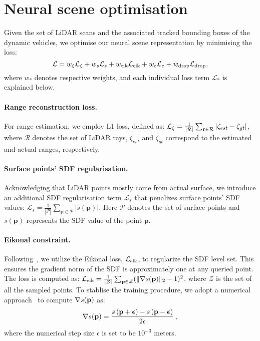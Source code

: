 \section{Neural scene optimisation} \label{sec:optmisation}
Given the set of LiDAR scans and the associated tracked bounding boxes of the dynamic vehicles, we optimise our neural scene representation by minimising the loss:
\begin{equation}
    \mathcal{L} = w_{\zeta} \mathcal{L}_{\zeta} +  w_{s} \mathcal{L}_{s} + w_{\text{eik}} \mathcal{L}_{\text{eik}} + w_{e} \mathcal{L}_{e} + w_{\text{drop}} \mathcal{L}_{\text{drop}},
    \label{loss}
\end{equation}
where $w_{*}$ denotes respective weights, and each individual loss term $\mathcal{L}_*$ is explained below.


\paragraph{Range reconstruction loss.}
For range estimation, we employ L1 loss, defined as: $\mathcal{L}_{\zeta} = \frac{1}{|\mathcal{R}|}\sum_{\mathbf{r} \in \mathcal{R}}|\zeta_{est} -\zeta_{gt}|$, where $\mathcal{R}$ denotes the set of LiDAR rays, $\zeta_{est}$ and $\zeta_{gt}$ correspond to the estimated and actual ranges, respectively. 


\paragraph{Surface points' SDF regularisation.} \label{sec:surfacesdf}
Acknowledging that LiDAR points mostly come from actual surface, we introduce an additional SDF regularisation term $\mathcal{L}_{s}$ that penalizes surface points' SDF values: $\mathcal{L}_{s} = \frac{1}{|\mathcal{P}|}\sum_{\mathbf{p} \in \mathcal{P}}|s(\mathbf{p})|$. Here $\mathcal{P}$ denotes the set of surface points and $s({\mathbf{p}})$ represents the SDF value of the point $\mathbf{p}$.


\paragraph{Eikonal constraint.}
Following~\cite{icml2020_2086}, we utilize the Eikonal loss, $\mathcal{L}_{\text{eik}}$, to regularize the SDF level set. This ensures the gradient norm of the SDF is approximately one at any queried point. The loss is computed as: $\mathcal{L}_{\text{eik}} = \frac{1}{|\mathcal{Z}|} \sum_{\mathbf{p} \in \mathcal{Z}}( \| \nabla s(\mathbf{p}) \|_2 - 1)^2$, where $\mathcal{Z}$ is the set of all the sampled points. To stablise the training procedure, we adopt a numerical approach~\cite{li2023neuralangelo} to compute $\nabla s(\mathbf{p})$ as: 
\begin{equation}
    \nabla s(\mathbf{p}) = \frac{s \left( \mathbf{p} + \boldsymbol{\epsilon} \right) - s \left(\mathbf{p} - \boldsymbol{\epsilon} \right)}{2 \epsilon} \;,
    \label{eqn:central_diff_normal}
\end{equation}
where the numerical step size $\epsilon$ is set to be $10^{-3}$ meters.


